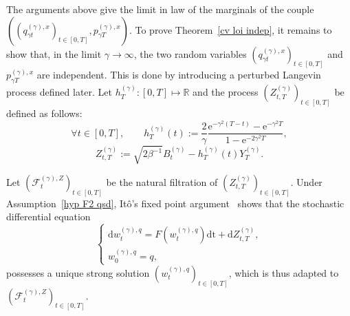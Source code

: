 \documentclass[preprint,EJP]{ejpecp}
\begin{document}

The arguments above give the limit in law of the marginals of the couple $((q^{(\gamma),x}_{\gamma t})_{t\in[0,T]},p^{(\gamma),x}_{\gamma T})$. To prove Theorem~\ref{cv loi indep}, it remains to show that, in the limit $\gamma\rightarrow\infty$, the two random variables $(q^{(\gamma),x}_{\gamma t})_{t\in[0,T]}$ and $p^{(\gamma),x}_{\gamma T}$ are independent. This is done by introducing a perturbed Langevin process defined later. Let $h^{(\gamma)}_T:[0,T]\mapsto\mathbb{R}$ and the process $(Z_{t,T}^{(\gamma)})_{t\in[0,T]}$ be defined as follows:
\begin{equation}\label{expr h}
    \forall t\in[0,T],\qquad h^{(\gamma)}_T(t):=\frac{2}{\gamma}\frac{\mathrm{e}^{- \gamma^2 (T-t)}-\mathrm{e}^{- \gamma^2 T}}{1-\mathrm{e}^{-2 \gamma^2 T}}, 
\end{equation} 
$$Z_{t,T}^{(\gamma)}:=\sqrt{2\beta^{-1}} B^{(\gamma)}_t-h^{(\gamma)}_T(t) Y_T^{(\gamma)}.$$
 

\noindent Let $(\mathcal{F}^{(\gamma),Z}_t)_{t \in [0,T]}$ be the natural filtration of $(Z_{t,T}^{(\gamma)})_{t\in[0,T]}$. Under Assumption~\ref{hyp F2 qsd}, Itô's fixed point argument~\cite[Thm 2.9 p. 289]{Karatzas} shows that the stochastic differential equation 
\begin{equation}\label{Overdamed Langevin 2}
  \left\{
    \begin{array}{ll}
        \mathrm{d}w^{(\gamma),q}_t=F(w^{(\gamma),q}_t) \mathrm{dt}+\mathrm{d}Z_{t,T}^{(\gamma)} , \\
        w^{(\gamma),q}_0=q,
    \end{array}
\right.   
\end{equation}
possesses a unique strong solution $(w^{(\gamma),q}_t)_{t \in [0,T]}$, which is thus adapted to $(\mathcal{F}^{(\gamma),Z}_t)_{t \in [0,T]}$.
\end{document}
